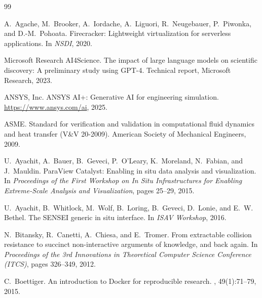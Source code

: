 \documentclass[letterpaper,twocolumn,10pt]{article}
\begin{document}
\iffalse
\begin{thebibliography}{99}

A.~Agache, M.~Brooker, A.~Iordache, A.~Liguori, R.~Neugebauer,
P.~Piwonka, and D.-M.~Pohoata.
\newblock Firecracker: Lightweight virtualization for serverless
  applications.
\newblock In {\em NSDI}, 2020.

Microsoft Research AI4Science.
\newblock The impact of large language models on scientific discovery:
  A preliminary study using GPT-4.
\newblock Technical report, Microsoft Research, 2023.

ANSYS, Inc.
\newblock ANSYS AI+: Generative AI for engineering simulation.
\newblock \url{https://www.ansys.com/ai}, 2025.

ASME.
\newblock Standard for verification and validation in computational
  fluid dynamics and heat transfer ({V\&V} 20-2009).
\newblock American Society of Mechanical Engineers, 2009.

U.~Ayachit, A.~Bauer, B.~Geveci, P.~O'Leary, K.~Moreland,
N.~Fabian, and J.~Mauldin.
\newblock ParaView Catalyst: Enabling in situ data analysis and
  visualization.
\newblock In {\em Proceedings of the First Workshop on In Situ
  Infrastructures for Enabling Extreme-Scale Analysis and
  Visualization}, pages 25--29, 2015.

U.~Ayachit, B.~Whitlock, M.~Wolf, B.~Loring, B.~Geveci, D.~Lonie,
and E.~W. Bethel.
\newblock The {SENSEI} generic in situ interface.
\newblock In {\em ISAV Workshop}, 2016.

N.~Bitansky, R.~Canetti, A.~Chiesa, and E.~Tromer.
\newblock From extractable collision resistance to succinct
  non-interactive arguments of knowledge, and back again.
\newblock In {\em Proceedings of the 3rd Innovations in Theoretical
  Computer Science Conference (ITCS)}, pages 326--349, 2012.

C.~Boettiger.
\newblock An introduction to {Docker} for reproducible research.
, 49(1):71--79,
  2015.


\end{thebibliography}
\end{document}
